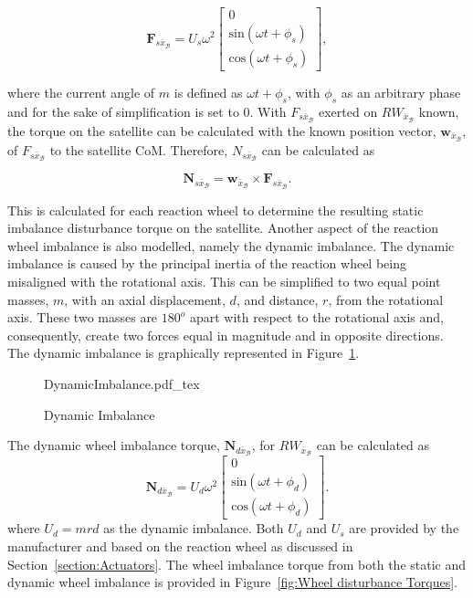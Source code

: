 \begin{equation}
\mathbf{F}_{s\bar{x}_\mathcal{B}} = U_s\omega^2 \begin{bmatrix} 0 \\ \text{sin}(\omega t + \phi_s) \\ \text{cos}(\omega t + \phi_s)\end{bmatrix},
\end{equation}

where the current angle of $m$ is defined as $\omega t + \phi_s$, with $\phi_s$ as an arbitrary phase and for the sake of simplification is set to $0$. With $F_{s\bar{x}_\mathcal{B}}$ exerted on $RW_{\bar{x}_\mathcal{B}}$ known, the torque on the satellite can be calculated with the known position vector, $\mathbf{w}_{\bar{x}_\mathcal{B}}$, of $F_{s\bar{x}_\mathcal{B}}$ to the satellite CoM. Therefore, $N_{s\bar{x}_\mathcal{B}}$ can be calculated as

\begin{equation}
\mathbf{N}_{s\bar{x}_\mathcal{B}} = \mathbf{w}_{\bar{x}_\mathcal{B}} \times \mathbf{F}_{s\bar{x}_\mathcal{B}}.
\end{equation}

This is calculated for each reaction wheel to determine the resulting static imbalance disturbance torque on the satellite. Another aspect of the reaction wheel imbalance is also modelled, namely the dynamic imbalance. The dynamic imbalance is caused by the principal inertia of the reaction wheel being misaligned with the rotational axis. This can be simplified to two equal point masses, $m$, with an axial displacement, $d$, and distance, $r$, from the rotational axis. These two masses are $\num{180}^o$ apart with respect to the rotational axis and, consequently, create two forces equal in magnitude and in opposite directions. The dynamic imbalance is graphically represented in Figure~\ref{fig:DynamicImbalance}.

\begin{figure}[!htb]
	\centering
	\def\svgwidth{10cm}
	{DynamicImbalance.pdf_tex}
	\caption{Dynamic Imbalance}
	\label{fig:DynamicImbalance}
\end{figure}

The dynamic wheel imbalance torque, $\mathbf{N}_{d\bar{x}_\mathcal{B}}$, for $RW_{\bar{x}_\mathcal{B}}$ can be calculated as 
\begin{equation}
\mathbf{N}_{d\bar{x}_\mathcal{B}} = U_d\omega^2 \begin{bmatrix} 0 \\ \text{sin}(\omega t + \phi_d) \\ \text{cos}(\omega t + \phi_d)\end{bmatrix}.
\end{equation}
where $U_d = mrd$ as the dynamic imbalance. Both $U_d$ and $U_s$ are provided by the manufacturer and based on the reaction wheel as discussed in Section~\ref{section:Actuators}. The wheel imbalance torque from both the static and dynamic wheel imbalance is provided in Figure~\ref{fig:Wheel disturbance Torques}.

